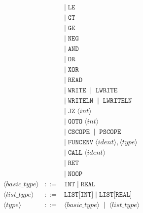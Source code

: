 \documentclass{article}
\begin{document}
\[\begin{array}{rcl}
&& \mid\; \texttt{LE}
\\[2pt]

&& \mid\; \texttt{GT}
\\[2pt]

&& \mid\; \texttt{GE}
\\[2pt]

&& \mid\; \texttt{NEG}
\\[2pt]

&& \mid\; \texttt{AND}
\\[2pt]

&& \mid\; \texttt{OR}
\\[2pt]

&& \mid\; \texttt{XOR}
\\[2pt]

&& \mid\; \texttt{READ}
\\[2pt]

&& \mid\; \texttt{WRITE} \;\mid\; \texttt{LWRITE}
\\[2pt]

&& \mid\; \texttt{WRITELN} \;\mid\; \texttt{LWRITELN}
\\[2pt]

&& \mid\; \texttt{JZ} \; \langle int \rangle
\\[2pt]

&& \mid\; \texttt{GOTO} \; \langle int \rangle
\\[2pt]

&& \mid\; \texttt{CSCOPE} \;\mid\; \texttt{PSCOPE}
\\[2pt]

&& \mid\; \texttt{FUNCENV} \; \langle ident \rangle, \langle type \rangle
\\[2pt]

&& \mid\; \texttt{CALL} \; \langle ident \rangle
\\[2pt]

&& \mid\; \texttt{RET}
\\[2pt]

&& \mid\; \texttt{NOOP}
\\[15pt]

\langle \mathit{basic\_type} \rangle &::=& \texttt{INT} \;\mid\; \texttt{REAL}\\[6pt]

\langle \mathit{list\_type} \rangle &::=& \texttt{LIST[INT]} \;\mid\; \texttt{LIST[REAL]}  \\[6pt]

\langle \mathit{type} \rangle &::=& \langle \mathit{basic\_type} \rangle \;\mid\; \langle \mathit{list\_type} \rangle \\[6pt]


\end{array}\]
\end{document}
